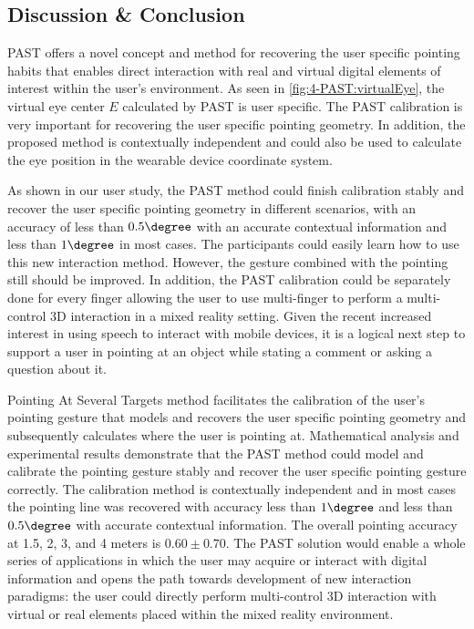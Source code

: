 \subsection{Discussion \& Conclusion}
PAST offers a novel concept and method for recovering the user specific pointing habits that enables direct interaction with real and virtual digital elements of interest within the user's environment. 
As seen in \figurename{ \ref{fig:4-PAST:virtualEye}}, the virtual eye center $E$ calculated by PAST is user specific. The PAST calibration is very important for recovering the user specific pointing geometry. In addition, the proposed method is contextually independent and could also be used to calculate the eye position in the wearable device coordinate system. 

As shown in our user study, the PAST method could finish calibration stably and recover the user specific pointing geometry in different scenarios, with an accuracy of less than $0.5\degree$ with an accurate contextual information and less than $1\degree$ in most cases. The participants could easily learn how to use this new interaction method. However, the gesture combined with the pointing still should be improved. In addition, the PAST calibration could be separately done for every  finger allowing the user to use multi-finger to perform a multi-control 3D interaction in a mixed reality setting. Given the recent increased interest in using speech to interact with mobile devices, it is a logical next step to support a user in pointing at an object while stating a comment or asking a question about it.

Pointing At Several Targets method facilitates the calibration of the user's pointing gesture that models and recovers the user specific pointing geometry and subsequently calculates where the user is pointing at. Mathematical analysis and experimental results demonstrate that the PAST method could model and calibrate the pointing gesture stably and recover the user specific pointing gesture correctly. The calibration method is contextually independent and in most cases the pointing line was recovered with accuracy less than $1\degree$ and less than $0.5\degree$ with accurate contextual information. The overall pointing accuracy at 1.5, 2, 3, and 4 meters is $0.60\pm0.70$\degree. The PAST solution would enable a whole series of applications in which the user may acquire or interact with digital information and opens the path towards development of new interaction paradigms: the user could directly perform multi-control 3D interaction with virtual or real elements placed within the mixed reality environment.